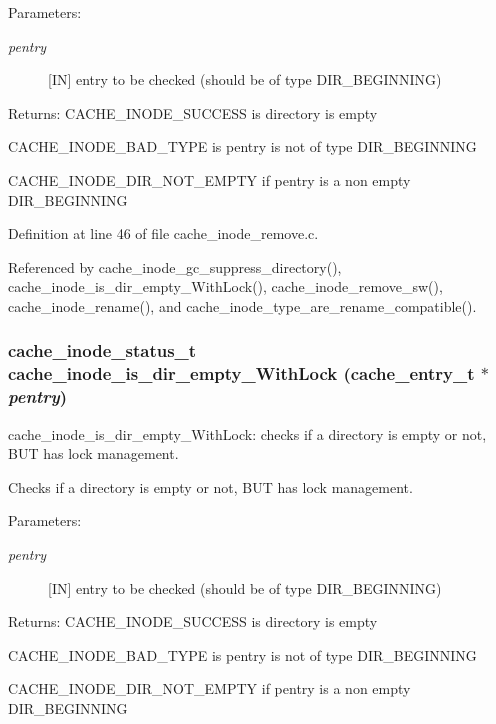 \begin{Desc}
\item[Parameters:]
\begin{description}
\item[{\em pentry}][IN] entry to be checked (should be of type DIR\_\-BEGINNING)\end{description}
\end{Desc}
\begin{Desc}
\item[Returns:]CACHE\_\-INODE\_\-SUCCESS is directory is empty\par
 

CACHE\_\-INODE\_\-BAD\_\-TYPE is pentry is not of type DIR\_\-BEGINNING\par
 

CACHE\_\-INODE\_\-DIR\_\-NOT\_\-EMPTY if pentry is a non empty DIR\_\-BEGINNING \end{Desc}


Definition at line 46 of file cache\_\-inode\_\-remove.c.

Referenced by cache\_\-inode\_\-gc\_\-suppress\_\-directory(), cache\_\-inode\_\-is\_\-dir\_\-empty\_\-With\-Lock(), cache\_\-inode\_\-remove\_\-sw(), cache\_\-inode\_\-rename(), and cache\_\-inode\_\-type\_\-are\_\-rename\_\-compatible().
\subsubsection{\setlength{\rightskip}{0pt plus 5cm}cache\_\-inode\_\-status\_\-t cache\_\-inode\_\-is\_\-dir\_\-empty\_\-With\-Lock (cache\_\-entry\_\-t $\ast$ {\em pentry})}\label{cache__inode__remove_8c_a1}


cache\_\-inode\_\-is\_\-dir\_\-empty\_\-With\-Lock: checks if a directory is empty or not, BUT has lock management.

Checks if a directory is empty or not, BUT has lock management.

\begin{Desc}
\item[Parameters:]
\begin{description}
\item[{\em pentry}][IN] entry to be checked (should be of type DIR\_\-BEGINNING)\end{description}
\end{Desc}
\begin{Desc}
\item[Returns:]CACHE\_\-INODE\_\-SUCCESS is directory is empty\par
 

CACHE\_\-INODE\_\-BAD\_\-TYPE is pentry is not of type DIR\_\-BEGINNING\par
 

CACHE\_\-INODE\_\-DIR\_\-NOT\_\-EMPTY if pentry is a non empty DIR\_\-BEGINNING \end{Desc}


